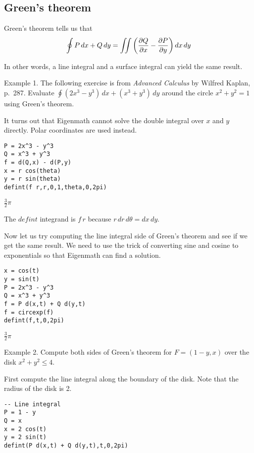 
\subsection{Green's theorem}
Green's theorem tells us that
$$\oint P\,dx+Q\,dy=\int\!\!\!\int
\left({\partial Q\over\partial x}-{\partial P\over\partial y}\right)
dx\,dy$$

\noindent
In other words, a line integral and a surface integral can yield
the same result.

\bigskip
\noindent
Example 1.
The following exercise is from {\it Advanced Calculus}
by Wilfred Kaplan, p.~287.
Evaluate $\oint (2x^3-y^3)\,dx+(x^3+y^3)\,dy$ around the circle
$x^2+y^2=1$ using Green's theorem.

\bigskip
\noindent
It turns out that Eigenmath cannot solve the double integral over
$x$ and $y$ directly.
Polar coordinates are used instead.

\begin{Verbatim}[formatcom=\color{blue},samepage=true]
P = 2x^3 - y^3
Q = x^3 + y^3
f = d(Q,x) - d(P,y)
x = r cos(theta)
y = r sin(theta)
defint(f r,r,0,1,theta,0,2pi)
\end{Verbatim}

\noindent
$\displaystyle \tfrac{3}{2}\pi$

\bigskip
\noindent
The $defint$ integrand is $f\,r$ because $r\,dr\,d\theta=dx\,dy$.

\bigskip
\noindent
Now let us try computing the line integral side of Green's theorem
and see if we get the same result.
We need to use the trick of converting sine and cosine to exponentials
so that Eigenmath can find a solution.

\begin{Verbatim}[formatcom=\color{blue},samepage=true]
x = cos(t)
y = sin(t)
P = 2x^3 - y^3
Q = x^3 + y^3
f = P d(x,t) + Q d(y,t)
f = circexp(f)
defint(f,t,0,2pi)
\end{Verbatim}

\noindent
$\displaystyle \tfrac{3}{2}\pi$

\bigskip
\noindent
Example 2.
Compute both sides of Green's theorem for
$F=(1-y,x)$ over the disk $x^2+y^2\le4$.

\bigskip
\noindent
First compute the line integral along the boundary of the disk.
Note that the radius of the disk is 2.

\begin{Verbatim}[formatcom=\color{blue},samepage=true]
-- Line integral
P = 1 - y
Q = x
x = 2 cos(t)
y = 2 sin(t)
defint(P d(x,t) + Q d(y,t),t,0,2pi)
\end{Verbatim}

